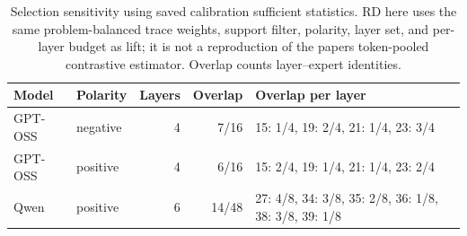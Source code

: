 \begin{table}[ht]\centering\small
\caption{Selection sensitivity using saved calibration sufficient statistics. RD here uses the same problem-balanced trace weights, support filter, polarity, layer set, and per-layer budget as lift; it is not a reproduction of the paper\textquotesingle s token-pooled contrastive estimator. Overlap counts layer--expert identities.}
\label{tab:selection-audit}
\begin{tabular}{llrrl}\toprule
Model & Polarity & Layers & Overlap & Overlap per layer \\\midrule
GPT-OSS & negative & 4 & 7/16 & 15: 1/4, 19: 2/4, 21: 1/4, 23: 3/4 \\
GPT-OSS & positive & 4 & 6/16 & 15: 2/4, 19: 1/4, 21: 1/4, 23: 2/4 \\
Qwen & positive & 6 & 14/48 & 27: 4/8, 34: 3/8, 35: 2/8, 36: 1/8, 38: 3/8, 39: 1/8 \\
\bottomrule\end{tabular}\end{table}
